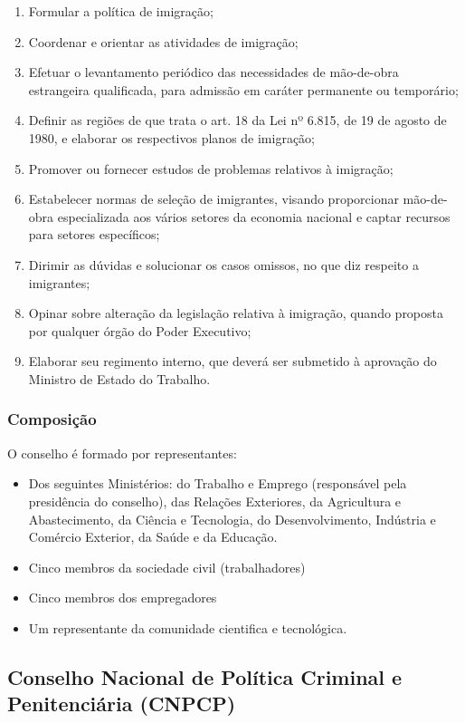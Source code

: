 \begin{enumerate}
\item 
Formular a política de imigração;
\item 
Coordenar e orientar as atividades de imigração;
\item 
Efetuar o levantamento periódico das necessidades de mão-de-obra
estrangeira qualificada, para admissão em caráter permanente ou
temporário;
\item 
Definir as regiões de que trata o art. 18 da Lei nº 6.815,
de 19 de agosto de 1980, e elaborar os respectivos planos de
imigração;
\item 
Promover ou fornecer estudos de problemas relativos à
imigração;
\item 
Estabelecer normas de seleção de imigrantes, visando proporcionar
mão-de-obra especializada aos vários setores da economia nacional e
captar recursos para setores específicos;
\item 
Dirimir as dúvidas e solucionar os casos omissos, no que diz respeito
a imigrantes;
\item 
Opinar sobre alteração da legislação relativa à
imigração, quando proposta por qualquer órgão do Poder
Executivo;
\item 
Elaborar seu regimento interno, que deverá ser submetido à
aprovação do Ministro de Estado do Trabalho.
\end{enumerate}

\subsubsection*{Composição}


O conselho é formado por representantes:

\begin{itemize}
\item 
Dos seguintes Ministérios: do Trabalho e Emprego (responsável pela
presidência do conselho), das Relações Exteriores, da
Agricultura e Abastecimento, da Ciência e Tecnologia, do
Desenvolvimento, Indústria e Comércio Exterior, da Saúde e da
Educação.
\item 
Cinco membros da sociedade civil (trabalhadores)
\item 
Cinco membros dos empregadores
\item 
Um representante da comunidade cientifica e tecnológica.
\end{itemize}
\newpage
\subsection*{Conselho Nacional de Política Criminal e Penitenciária (CNPCP)}


